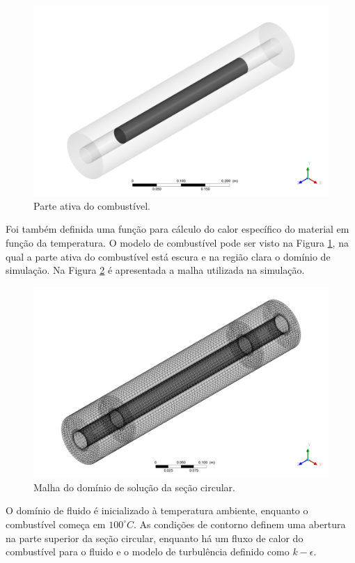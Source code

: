 \documentclass[12pt,openright,twoside,a4paper,english,french,spanish,brazil]{abntex2}
\begin{document}
\begin{anexosenv}
\begin{figure}[h]
  \centering\includegraphics[scale=0.4]{figuras/combustivel.png}
  \caption{Parte ativa do combustível.}
  \label{fig:fuel}
\end{figure}

Foi também definida uma função para cálculo do calor específico do material em função da temperatura.
O modelo de combustível pode ser visto na Figura \ref{fig:fuel}, na qual a parte ativa do combustível está escura e na região clara o domínio de simulação. Na Figura \ref{fig:scmalha} é apresentada a malha utilizada na simulação.

\begin{figure}[h]
  \centering\includegraphics[scale=0.4]{figuras/fluido.png}
  \caption{Malha do domínio de solução da seção circular.}
  \label{fig:scmalha}
\end{figure}

O domínio de fluido é inicializado à temperatura ambiente, enquanto o combustível começa em $100^{\circ}C$. As condições de contorno definem uma abertura na parte superior da seção circular, enquanto há um fluxo de calor do combustível para o fluido e o modelo de turbulência definido como $k-\epsilon$.


\end{anexosenv}
\end{document}
